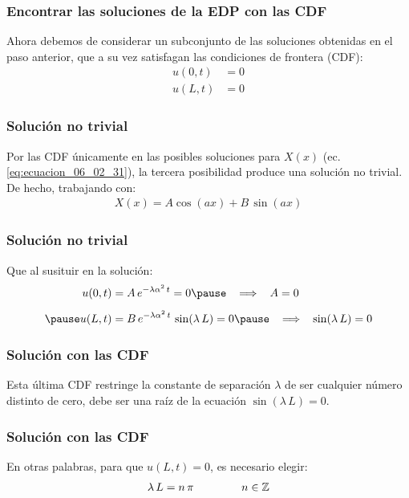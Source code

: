 \documentclass[12pt]{beamer}
\begin{document}
\begin{frame}
\frametitle{Encontrar las soluciones de la EDP con las CDF}
Ahora debemos de considerar un subconjunto de las soluciones obtenidas en el paso anterior, que a su vez satisfagan las condiciones de frontera (CDF):
\pause
\begin{align*}
u (0, t) &= 0 \\[0.5em]
u (L, t) &= 0
\end{align*}
\end{frame}
\begin{frame}
\frametitle{Solución no trivial}
Por las CDF únicamente en las posibles soluciones para $X(x)$ (ec. \ref{eq:ecuacion_06_02_31}), la tercera posibilidad produce una solución no trivial. De hecho, trabajando con:
\pause
\begin{align*}
X (x) = A \cos (a x) + B \, \sin (a x)
\end{align*}
\end{frame}
\begin{frame}
\frametitle{Solución no trivial}
Que al susituir en la solución:
\pause
\begin{eqnarray*}
\begin{aligned}
u (0, t) &= A \, e^{-\lambda \alpha^{2} \, t} = 0 \pause \hspace{0.3cm} \Longrightarrow \hspace{0.3cm} A = 0 \\[0.5em] \pause
u (L, t) &= B \, e^{-\lambda \alpha^{2} \, t} \, \sin (\lambda \, L) = 0 \pause \hspace{0.3cm} \Longrightarrow \hspace{0.3cm} \sin (\lambda \, L) = 0
\end{aligned}
\end{eqnarray*}
\end{frame}
\begin{frame}
\frametitle{Solución con las CDF}
Esta última CDF restringe la constante de separación $\lambda$ de ser cualquier número distinto de cero, debe ser una raíz de la ecuación $\sin (\lambda \, L) = 0$.
\end{frame}
\begin{frame}
\frametitle{Solución con las CDF}
En otras palabras, para que $u(L, t) = 0$, es necesario elegir:
\pause
\begin{align}
\lambda \, L = n \, \pi \hspace{1.5cm} n \in \mathbb{Z}
\label{eq:ecuacion_06_02_34}    
\end{align}
\end{frame}
\end{document}
